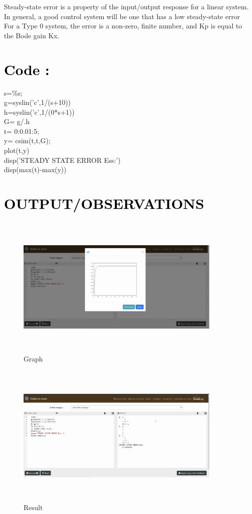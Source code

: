 \documentclass[12pt]{article}
\begin{document}
Steady-state error is a property of the input/output response for a linear system. In general, a good control system will be one that has a low steady-state error
For a Type 0 system, the error is a non-zero, finite number, and Kp is equal to the Bode gain Kx. \par

\section*{\textcolor{black}{Code :}}

   s=\%s;\\ 
   g=syslin('c',1/(s+10))\\
   h=syslin('c',1/(0*s+1))\\
   G= g/.h\\
   t= 0:0.01:5;\\
   y= csim(t,t,G);\\
   plot(t,y)\\
   disp('STEADY STATE ERROR Ess:')\\
   disp(max(t)-max(y)) \par 

\section*{\textcolor{black}{OUTPUT/OBSERVATIONS}}

\begin{figure}[!hth]
        \centering
        \includegraphics[width =10cm, height = 7cm]{images/exp11.png}
        \caption{Graph}
        \label{Graph}
\end{figure}
\begin{figure}[!hth]
        \centering
        \includegraphics[width =10cm, height = 7cm]{images/exp12.png}
        \caption{Result}
        \label{Result}
\end{figure}
\end{document}
